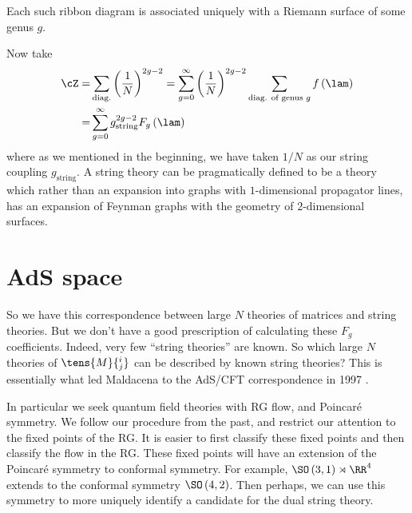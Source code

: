 \documentclass{booc}
\begin{document}
\begin{thm}
Each such ribbon diagram is associated uniquely with a Riemann surface
of some genus $g$.
\end{thm}

Now take
\begin{align}
\cZ =& \sum_{\text{diag.}} \left( \frac{1}{N} \right)^{2g - 2}
= \sum_{g = 0}^\infty \left( \frac{1}{N} \right)^{2g - 2} 
\sum_{\text{diag. of genus }g} f\left( \lam \right)
\\=& \sum_{g = 0}^\infty g_{\text{string}}^{2g - 2} F_g\left( \lam \right)
\end{align}
where as we mentioned in the beginning, we have taken $1/N$ as our string coupling
$g_{\text{string}}$.
A string theory can be pragmatically defined to be a theory which rather than 
an expansion into graphs with $1$-dimensional propagator lines, 
has an expansion of Feynman graphs with the geometry of $2$-dimensional surfaces.

\section{AdS space}

So we have this correspondence between large $N$ theories of matrices and string theories. 
But we don't have a good prescription of calculating these $F_g$ coefficients. 
Indeed, very few ``string theories'' are known.
So which large $N$ theories of $\tens{M}{^i_j}$ can be described by known string theories?
This is essentially what led Maldacena to the AdS/CFT correspondence in 1997
\cite{ads_cft}.

In particular we seek quantum field theories with RG flow, and Poincar\'e symmetry. 
We follow our procedure from the past, 
and restrict our attention to the fixed points of the RG. 
It is easier to first classify these fixed points and then classify the flow in the RG. 
These fixed points will have an extension of the Poincar\'e symmetry to conformal symmetry. 
For example, $\SO\left( 3,1 \right)\rtimes \RR^4$ extends to the conformal symmetry
$\SO\left( 4,2 \right)$.
Then perhaps, we can use this symmetry to more uniquely identify a 
candidate for the dual string theory. 
\end{document}
